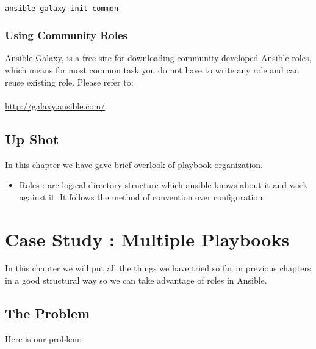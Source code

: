 \documentclass[10pt]{book}
\begin{document}
\begin{Verbatim} 
 
ansible-galaxy init common

\end{Verbatim}


\subsection{Using Community Roles}
Ansible Galaxy, is a free site for downloading community developed Ansible 
roles, which means for most common task you do not have to write any role and 
can reuse existing role. Please refer to:
\\
\\
\url{http://galaxy.ansible.com/}



\section{Up Shot}
In this chapter we have gave brief overlook of playbook organization. 

\begin{itemize}
\item Roles : are logical directory structure which ansible knows about it and work 
 against it. It follows the method of convention over configuration. 
\end{itemize}






\chapter{Case Study : Multiple Playbooks}
\label{chap-multiple-playbooks}
In this chapter we will put all the things we have tried so far in previous chapters in a good 
structural way so we can take advantage of roles in Ansible.

\section{The Problem}
Here is our problem:
\end{document}

